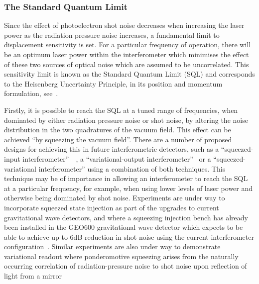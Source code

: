 \documentclass{article}
\begin{document}
\subsubsection{The Standard Quantum Limit}
\label{subsubsection:SQL}

Since the effect of photoelectron shot noise decreases when increasing the laser
power as the radiation pressure noise increases, a fundamental limit to
displacement sensitivity is set. For a particular frequency of operation, there
will be an optimum laser power within the interferometer which minimises the
effect of these two sources of optical noise which are assumed to be
uncorrelated. This sensitivity limit is known as the Standard Quantum Limit
(SQL) and corresponds to the Heisenberg Uncertainty Principle, in its position
and momentum formulation, see~\cite{Edelstein, Caves1, Caves2, Loudon:1981}.

Firstly, it is possible to reach the SQL at a tuned range of frequencies, when
dominated by either radiation pressure noise or shot noise, by altering the
noise distribution in the two quadratures of the vacuum field. This effect can
be achieved ``by squeezing the vacuum field''. There are a number of proposed
designs for achieving this in future interferometric detectors, such as a
``squeezed-input interferometer''~\cite{Caves2}~\cite{Unruh:1982}, a
``variational-output interferometer''~\cite{Vyatchanin:1993} or a
``squeezed-variational interferometer'' using a combination of both techniques.
This technique may be of importance in allowing an interferometer to reach the
SQL at a particular frequency, for example, when using lower levels of laser
power and otherwise being dominated by shot noise. Experiments are under way to
incorporate squeezed state injection as part of the upgrades to current
gravitational wave detectors, and where a squeezing injection bench has already
been installed in the GEO600 gravitational wave detector which expects to be
able to achieve up to 6dB reduction in shot noise using the current
interferometer configuration~\cite{Vahlbruch:2010}. Similar experiments are also
under way to demonstrate variational readout where ponderomotive squeezing
arises from the naturally occurring correlation of radiation-pressure noise to
shot noise upon reflection of light from a
mirror~\cite{Corbitt:2006,Sakata:2006}
\end{document}
